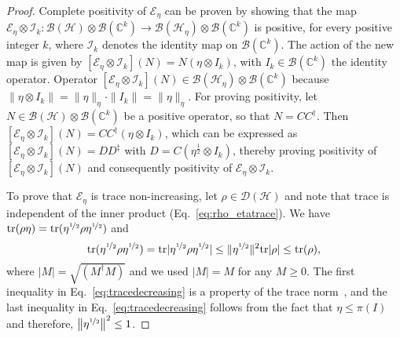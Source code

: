 \documentclass[amsmath,amssymb,aps,pra,superscriptaddress,twocolumn]{revtex4-2}
\begin{document}
\begin{appendix}
\begin{proof}
Complete positivity of $\mathcal{E}_\eta$ can be proven by showing that the map 
$\mathcal{E}_\eta \otimes \mathscr{I}_k:\mathcal{B}\left(\mathscr{H}\right)\otimes\mathcal{B}(\mathbb{C}^k) \to\mathcal{B}\left(\mathscr{H}_\eta\right)\otimes\mathcal{B}(\mathbb{C}^k)  $ 
is positive,
for every positive integer $k$,
where $\mathscr{I}_k$ denotes the identity map on $\mathcal{B}(\mathbb{C}^k)$. 
The action of the new map is given by
$\left[\mathcal{E}_\eta \otimes \mathscr{I}_k\right]\left(N\right)= N \left(\eta \otimes I_k\right)$,
with $I_k \in \mathcal{B}(\mathbb{C}^k)$
the identity operator. 
Operator 
$\left[\mathcal{E}_\eta \otimes \mathscr{I}_k\right](N)\in\mathcal{B}\left(\mathscr{H}_\eta\right)\otimes\mathcal{B}(\mathbb{C}^k) $
because $\|\eta \otimes I_k\| = \|\eta\|_\eta\cdot\|I_k\| = \|\eta\|_\eta$. 
For proving positivity,
let $N\in \mathcal{B}(\mathscr{H})\otimes \mathcal{B}(\mathbb{C}^k)$ be a positive operator,
so that $N = C C^\dagger$. Then $\left[\mathcal{E}_\eta \otimes \mathscr{I}_k\right](N) = C C^\dagger (\eta \otimes I_k)$, 
which can be expressed as $\left[\mathcal{E}_\eta \otimes \mathscr{I}_k\right] (N) =D D^\ddagger$ with
$D = C(\eta^{\frac12}\otimes I_k)$,
thereby proving positivity of $\left[\mathcal{E}_\eta \otimes \mathscr{I}_k\right](N)$ and consequently positivity of 
$\mathcal{E}_\eta \otimes \mathscr{I}_k$.

To prove that $\mathcal{E}_\eta$ is trace non-increasing, let $\rho \in \mathcal{D}(\mathscr{H})$
and note that trace is independent of the inner product (Eq.~\eqref{eq:rho_etatrace}).
We have $\text{tr}(\rho\eta) = \text{tr}(\eta^{\nicefrac{1}{2}}\rho\eta^{\nicefrac{1}{2}})$
and 
\begin{equation}\label{eq:tracedecreasing}
    \text{tr}(\eta^{\nicefrac{1}{2}}\rho\eta^{\nicefrac{1}{2}}) = 
    \text{tr}|\eta^{\nicefrac{1}{2}}\rho\eta^{\nicefrac{1}{2}}|
    \le \|\eta^{\nicefrac{1}{2}}\|^2\text{tr}|\rho| \le \text{tr}(\rho),
\end{equation}
where $|M| = \sqrt{\left(M^\dagger M\right)}$ and we used $|M| = M$ for any $M \ge 0$. 
The first inequality in Eq.~\eqref{eq:tracedecreasing} is a property of the trace norm~\cite{Con07}, and the last inequality in Eq.~\eqref{eq:tracedecreasing} follows from the fact that $\eta\leq \pi(I)$ and therefore, $\left\|\eta^{\nicefrac{1}{2}}\right\|^2\leq 1$.

\end{proof}


\end{appendix}
\end{document}

